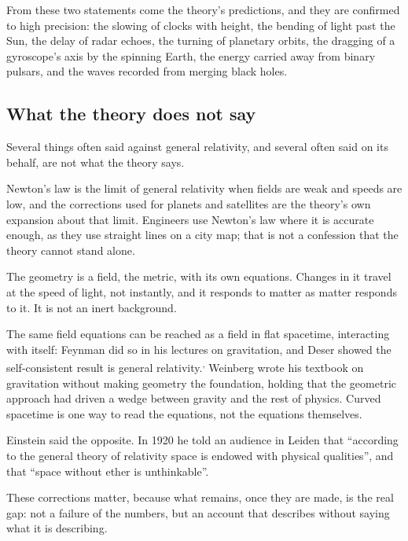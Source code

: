\documentclass[11pt,a4paper]{article}
\begin{document}
From these two statements come the theory's predictions, and they are confirmed to high precision: the slowing of clocks with height, the bending of light past the Sun, the delay of radar echoes, the turning of planetary orbits, the dragging of a gyroscope's axis by the spinning Earth, the energy carried away from binary pulsars, and the waves recorded from merging black holes.

\subsection{What the theory does not say}

Several things often said against general relativity, and several often said on its behalf, are not what the theory says.

 Newton's law is the limit of general relativity when fields are weak and speeds are low, and the corrections used for planets and satellites are the theory's own expansion about that limit. Engineers use Newton's law where it is accurate enough, as they use straight lines on a city map; that is not a confession that the theory cannot stand alone.

 The geometry is a field, the metric, with its own equations. Changes in it travel at the speed of light, not instantly, and it responds to matter as matter responds to it. It is not an inert background.

 The same field equations can be reached as a field in flat spacetime, interacting with itself: Feynman did so in his lectures on gravitation, and Deser showed the self-consistent result is general relativity.\textsuperscript{,} Weinberg wrote his textbook on gravitation without making geometry the foundation, holding that the geometric approach had driven a wedge between gravity and the rest of physics. Curved spacetime is one way to read the equations, not the equations themselves.

 Einstein said the opposite. In 1920 he told an audience in Leiden that ``according to the general theory of relativity space is endowed with physical qualities'', and that ``space without ether is unthinkable''.

These corrections matter, because what remains, once they are made, is the real gap: not a failure of the numbers, but an account that describes without saying what it is describing.
\end{document}
